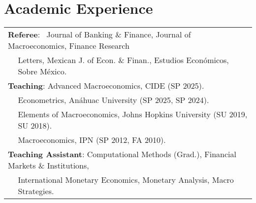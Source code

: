 \documentclass[12pt]{article}
\newcommand{\vsect}{\vspace{0.08cm}}
\begin{document}
	
	\section{Academic Experience} 
	\vsect
	\begin{tabular}{l m{15.3cm}}
		\multicolumn{2}{l}{\textbf{Referee}:  \, Journal of Banking \& Finance, Journal of Macroeconomics, Finance Research } \\
		& \vspace{-0.1cm} Letters, Mexican J. of Econ. \& Finan., Estudios Económicos, Sobre México. \\
		\multicolumn{2}{l}{\textbf{Teaching}: Advanced Macroeconomics, CIDE (SP 2025).} \\ %
		& Econometrics, Anáhuac University (SP 2025, SP 2024). \\ %
		 & Elements of Macroeconomics, Johns Hopkins University (SU 2019, SU 2018). \\
		\qquad \qquad \, & Macroeconomics, IPN (SP 2012, FA 2010). \\ %
		\multicolumn{2}{l}{\textbf{Teaching Assistant}: Computational Methods (Grad.), Financial Markets \& Institutions,} \\
		& \multirow{1}{14cm}{International Monetary Economics, Monetary Analysis, Macro Strategies.} \\ %
		
		
	\end{tabular}
	
\end{document}
